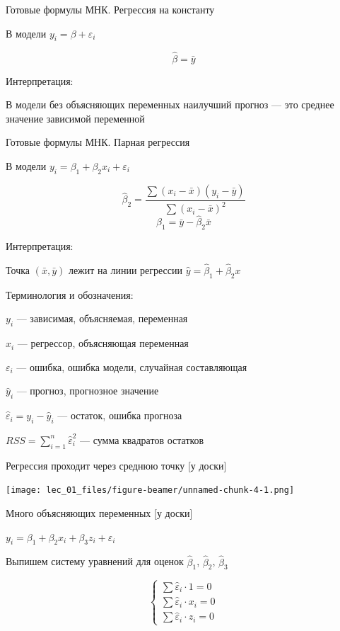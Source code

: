 \documentclass[ignorenonframetext,]{beamer}
\begin{document}
\begin{frame}{Готовые формулы МНК. Регрессия на константу}

В модели \(y_i=\beta +\varepsilon_i\)

\[
\hat{\beta}=\bar{y}
\]

Интерпретация:

В модели без объясняющих переменных наилучший прогноз --- это среднее
значение зависимой переменной

\end{frame}

\begin{frame}{Готовые формулы МНК. Парная регрессия}

В модели \(y_i=\beta_1+\beta_2 x_i +\varepsilon_i\)

\[
\hat{\beta}_2=\frac{\sum (x_i-\bar{x})(y_i-\bar{y})}{\sum (x_i-\bar{x})^2}
\] \[
\hat{\beta}_1=\bar{y}-\hat{\beta}_2\bar{x}
\]

Интерпретация:

Точка \((\bar{x},\bar{y})\) лежит на линии регрессии
\(\hat{y}=\hat{\beta}_1+\hat{\beta}_2 x\)

\end{frame}

\begin{frame}{Терминология и обозначения:}

\(y_i\) --- зависимая, объясняемая, переменная

\(x_i\) --- регрессор, объясняющая переменная

\(\varepsilon_i\) --- ошибка, ошибка модели, случайная составляющая

\(\hat{y}_i\) --- прогноз, прогнозное значение

\(\hat{\varepsilon}_i=y_i-\hat{y}_i\) --- остаток, ошибка прогноза

\(RSS=\sum_{i=1}^n \hat{\varepsilon}_i^2\) --- сумма квадратов остатков

\end{frame}

\begin{frame}{Регрессия проходит через среднюю точку {[}у доски{]}}

\texttt{[image: lec\_01\_files/figure-beamer/unnamed-chunk-4-1.png]}

\end{frame}

\begin{frame}{Много объясняющих переменных {[}у доски{]}}

\(y_i=\beta_1+\beta_2 x_i +\beta_3 z_i+\varepsilon_i\)

Выпишем систему уравнений для оценок \(\hat{\beta}_1\),
\(\hat{\beta}_2\), \(\hat{\beta}_3\)

\[
\begin{cases}
\sum \hat{\varepsilon}_i \cdot 1 =0 \\
\sum \hat{\varepsilon}_i \cdot x_i =0 \\
\sum \hat{\varepsilon}_i \cdot z_i =0
\end{cases}
\]

\end{frame}
\end{document}

